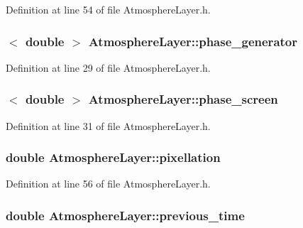 Definition at line 54 of file AtmosphereLayer.h.

\hypertarget{classAtmosphereLayer_ae1a5456c7be432f3fed0973dee92068f}{
\subsubsection[{phase\_\-generator}]{$<$ double $>$ {\bf AtmosphereLayer::phase\_\-generator}}}
\label{classAtmosphereLayer_ae1a5456c7be432f3fed0973dee92068f}


Definition at line 29 of file AtmosphereLayer.h.

\hypertarget{classAtmosphereLayer_a00be2b274438470e9e60c10e48fdb4e3}{
\subsubsection[{phase\_\-screen}]{$<$ double $>$ {\bf AtmosphereLayer::phase\_\-screen}}}
\label{classAtmosphereLayer_a00be2b274438470e9e60c10e48fdb4e3}


Definition at line 31 of file AtmosphereLayer.h.

\hypertarget{classAtmosphereLayer_a46e0ed39d72c3caddb436d1259d490fb}{
\subsubsection[{pixellation}]{\setlength{\rightskip}{0pt plus 5cm}double {\bf AtmosphereLayer::pixellation}}}
\label{classAtmosphereLayer_a46e0ed39d72c3caddb436d1259d490fb}


Definition at line 56 of file AtmosphereLayer.h.

\hypertarget{classAtmosphereLayer_a9e62e416473b02e0084be732dbd3fdc0}{
\subsubsection[{previous\_\-time}]{\setlength{\rightskip}{0pt plus 5cm}double {\bf AtmosphereLayer::previous\_\-time}}}
\label{classAtmosphereLayer_a9e62e416473b02e0084be732dbd3fdc0}


